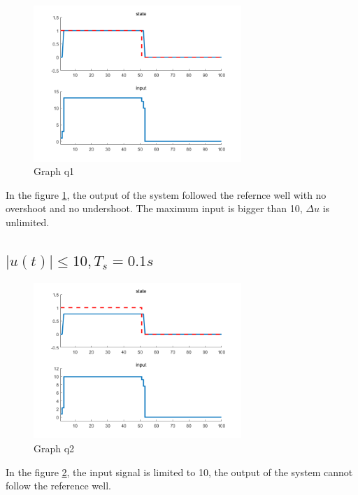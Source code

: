 \documentclass{article}
\begin{document}
\begin{figure}[h!]
    \centering
    \includegraphics[width=0.7\textwidth]{pb1 0.png}
    \caption{Graph q1}\label{fig:pb2graph1}
\end{figure}
In the figure \ref{fig:pb2graph1}, the output of the system followed the
refernce well with no overshoot and no undershoot. The maximum input is
bigger than 10, $\Delta u$ is unlimited.

\subsection{$\left| u(t)\right| \leq 10, T_s=0.1s$}

\begin{figure}[h!]
    \centering
    \includegraphics[width=0.7\textwidth]{pb1 1.png}
    \caption{Graph q2}\label{fig:pb2graph2}
\end{figure}
In the figure \ref{fig:pb2graph2}, the input signal is limited to 10,
the output of the system cannot follow the reference well.
\end{document}
